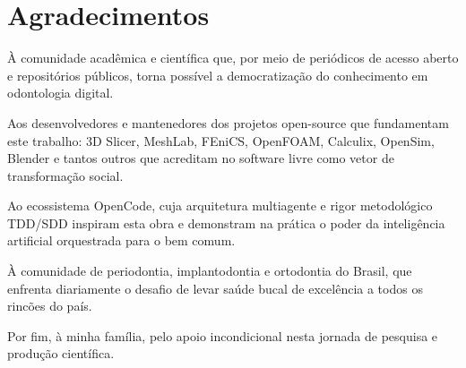 \newpage
\chapter*{Agradecimentos}

À comunidade acadêmica e científica que, por meio de periódicos de acesso aberto e repositórios públicos, torna possível a democratização do conhecimento em odontologia digital.

Aos desenvolvedores e mantenedores dos projetos open-source que fundamentam este trabalho: 3D Slicer, MeshLab, FEniCS, OpenFOAM, Calculix, OpenSim, Blender e tantos outros que acreditam no software livre como vetor de transformação social.

Ao ecossistema OpenCode, cuja arquitetura multiagente e rigor metodológico TDD/SDD inspiram esta obra e demonstram na prática o poder da inteligência artificial orquestrada para o bem comum.

À comunidade de periodontia, implantodontia e ortodontia do Brasil, que enfrenta diariamente o desafio de levar saúde bucal de excelência a todos os rincões do país.

Por fim, à minha família, pelo apoio incondicional nesta jornada de pesquisa e produção científica.
